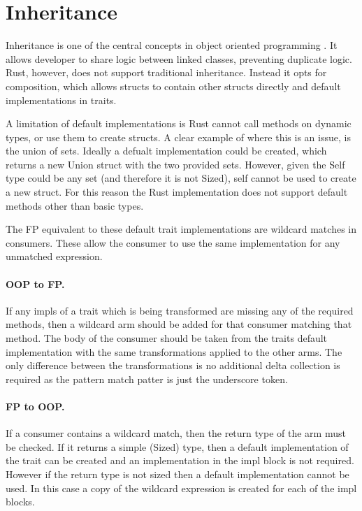 \documentclass[ oneside,%
                    author={James Elgar},
                    degree={MEng},
                     title={Bidirectional transformer between functional and \\ object-oriented programming in Rust},
                  subtitle={}]{dissertation}
\begin{document}
\section{Inheritance}
\label{sec:inheritance}

Inheritance is one of the central concepts in object oriented programming \cite{cook_palsberg_1989}. It allows developer to share logic between linked classes, preventing duplicate logic. Rust, however, does not support traditional inheritance. Instead it opts for composition, which allows structs to contain other structs directly and default implementations in traits.

A limitation of default implementations is Rust cannot call methods on dynamic types, or use them to create structs.
A clear example of where this is an issue, is the union of sets. Ideally a defualt implementation could be created, which returns a new Union struct with the two provided sets. However, given the Self type could be any set (and therefore it is not Sized), self cannot be used to create a new struct. For this reason the Rust implementation does not support default methods other than basic types.

The FP equivalent to these default trait implementations are wildcard matches in consumers. These allow the consumer to use the same implementation for any unmatched expression.

\paragraph{OOP to FP.} If any impls of a trait which is being transformed are missing any of the required methods, then a wildcard arm should be added for that consumer matching that method. The body of the consumer should be taken from the traits default implementation with the same transformations applied to the other arms. The only difference between the transformations is no additional delta collection is required as the pattern match patter is just the underscore token. 

\paragraph{FP to OOP.} If a consumer contains a wildcard match, then the return type of the arm must be checked. If it returns a simple (Sized) type, then a default implementation of the trait can be created and an implementation in the impl block is not required. However if the return type is not sized then a default implementation cannot be used. In this case a copy of the wildcard expression is created for each of the impl blocks. 
\end{document}
